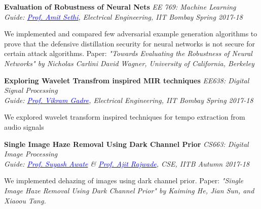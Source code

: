 \documentclass[margin,line]{res}
\newenvironment{list1}{
  \begin{list}{\ding{113}}{%
      \setlength{\itemsep}{0in}
      \setlength{\parsep}{0in} \setlength{\parskip}{0in}
      \setlength{\topsep}{0in} \setlength{\partopsep}{0in} 
      \setlength{\leftmargin}{0.17in}}}{\end{list}}
\begin{document}
\begin{resume}
{\bf Evaluation of Robustness of Neural Nets} \hfill {\it EE 769: Machine Learning} \\
{\em Guide: \href{https://www.ee.iitb.ac.in/~asethi/}{\textcolor{blue}{Prof. Amit Sethi}}, Electrical Engineering, IIT Bombay \hfill Spring 2017-18} \\
\vspace*{-.15in}
\begin{list1}
\item[] We implemented and compared few adversarial example generation algorithms to prove that the defensive distillation security for neural networks is not secure for certain attack algorithms. Paper: \textit{"Towards Evaluating the Robustness of Neural Networks" by Nicholas Carlini David Wagner, University of California, Berkeley} 

\end{list1}


{\bf Exploring Wavelet Transfrom inspired MIR techniques} \hfill \textit{EE638: Digital Signal Processing} \\
{\em Guide: \href{https://www.ee.iitb.ac.in/wiki/faculty/vmgadre}{\textcolor{blue}{Prof. Vikram Gadre}}, Electrical Engineering, IIT Bombay \hfill Spring 2017-18} \\
\vspace*{-.15in}
\begin{list1}
\item[] We explored wavelet transform inspired techniques for tempo extraction from audio signals
\end{list1}


{\bf Single Image Haze Removal Using Dark Channel Prior} \hfill \textit{CS663: Digital Image Processing} \\
{\em Guide: \href{https://www.cse.iitb.ac.in/~suyash}{\textcolor{blue}{Prof. Suyash Awate}} \& \href{https://www.cse.iitb.ac.in/~ajitvr}{\textcolor{blue}{Prof. Ajit Rajwade}}, CSE, IITB \hfill Autumn 2017-18} \\
\vspace*{-.15in}
\begin{list1}
\item[] We implemented dehazing of images using dark channel prior. Paper: \textit{"Single Image Haze Removal Using Dark Channel Prior" by Kaiming He, Jian Sun, and Xiaoou Tang.} 
\end{list1}


\end{resume}
\end{document}
